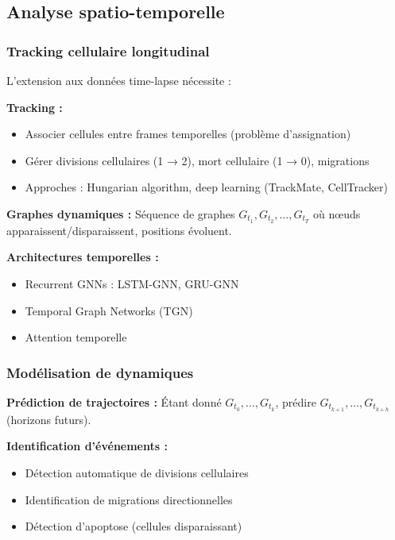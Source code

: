 \subsection{Analyse spatio-temporelle}

\subsubsection{Tracking cellulaire longitudinal}

L'extension aux données time-lapse nécessite :

\textbf{Tracking :}
\begin{itemize}
    \item Associer cellules entre frames temporelles (problème d'assignation)
    \item Gérer divisions cellulaires (1 → 2), mort cellulaire (1 → 0), migrations
    \item Approches : Hungarian algorithm, deep learning (TrackMate, CellTracker)
\end{itemize}

\textbf{Graphes dynamiques :}
Séquence de graphes $G_{t_1}, G_{t_2}, \ldots, G_{t_T}$ où nœuds apparaissent/disparaissent, positions évoluent.

\textbf{Architectures temporelles :}
\begin{itemize}
    \item Recurrent GNNs : LSTM-GNN, GRU-GNN
    \item Temporal Graph Networks (TGN)
    \item Attention temporelle
\end{itemize}

\subsubsection{Modélisation de dynamiques}

\textbf{Prédiction de trajectoires :}
Étant donné $G_{t_0}, \ldots, G_{t_k}$, prédire $G_{t_{k+1}}, \ldots, G_{t_{k+h}}$ (horizons futurs).

\textbf{Identification d'événements :}
\begin{itemize}
    \item Détection automatique de divisions cellulaires
    \item Identification de migrations directionnelles
    \item Détection d'apoptose (cellules disparaissant)
\end{itemize}

